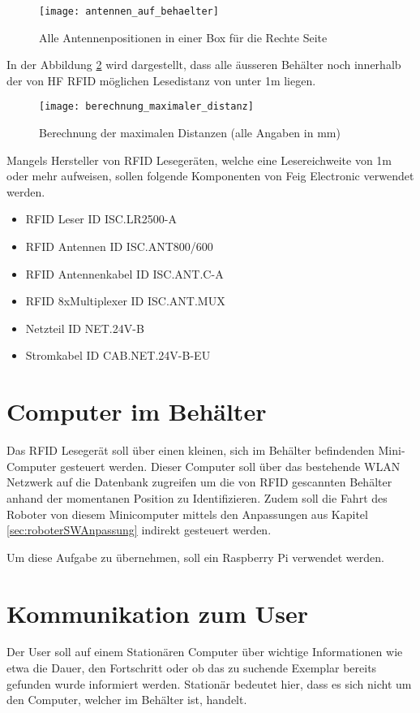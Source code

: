 \begin{figure}
	\centering
	\texttt{[image: antennen\_auf\_behaelter]}
	\caption{Alle Antennenpositionen in einer Box für die Rechte Seite}
	\label{fig:antennenPositionen}
\end{figure}

In der Abbildung \ref{fig:distanzcalc} wird dargestellt, dass alle äusseren Behälter noch innerhalb der von HF RFID möglichen Lesedistanz von unter 1m liegen.

\begin{figure}
	\centering
	\texttt{[image: berechnung\_maximaler\_distanz]}
	\caption{Berechnung der maximalen Distanzen (alle Angaben in mm)}
	\label{fig:distanzcalc}
\end{figure}

Mangels Hersteller von RFID Lesegeräten, welche eine Lesereichweite von 1m oder mehr aufweisen, sollen folgende Komponenten von Feig Electronic verwendet werden. 
\begin{itemize}
	\item RFID Leser ID ISC.LR2500-A
	\item RFID Antennen ID ISC.ANT800/600
	\item RFID Antennenkabel ID ISC.ANT.C-A
	\item RFID 8xMultiplexer ID ISC.ANT.MUX
	\item Netzteil ID NET.24V-B
	\item Stromkabel ID CAB.NET.24V-B-EU
\end{itemize}

\clearpage
\section{Computer im Behälter}
Das RFID Lesegerät soll über einen kleinen, sich im Behälter befindenden Mini-Computer gesteuert werden. Dieser Computer soll über das bestehende WLAN Netzwerk auf die Datenbank zugreifen um die von RFID gescannten Behälter anhand der momentanen Position zu Identifizieren.  
Zudem soll die Fahrt des Roboter von diesem Minicomputer mittels den Anpassungen aus Kapitel  \ref{sec:roboterSWAnpassung} indirekt gesteuert werden.

Um diese Aufgabe zu übernehmen, soll ein Raspberry Pi verwendet werden.

\section{Kommunikation zum User}
Der User soll auf einem Stationären Computer über wichtige Informationen wie etwa die Dauer, den Fortschritt oder ob das zu suchende Exemplar bereits gefunden wurde informiert werden. Stationär bedeutet hier, dass es sich nicht um den Computer, welcher im Behälter ist, handelt.

